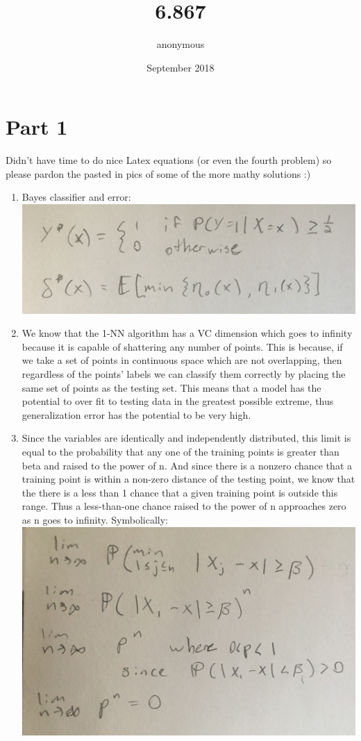 \documentclass{article}
\title{6.867}
\author{anonymous}
\date{September 2018}
\begin{document}
\maketitle

\section{Part 1}
Didn't have time to do nice Latex equations (or even the fourth problem) so please pardon the pasted in pics of some of the more mathy solutions :) 
\begin{enumerate}[label=\alph*.)]
	\item  Bayes classifier and error:\\
	\includegraphics[scale=.05]{IMG_3677.JPG}
	\item We know that the 1-NN algorithm has a VC dimension which goes to infinity because it is capable of shattering any number of points. This is because, if we take a set of points in continuous space which are not overlapping, then regardless of the points' labels we can classify them correctly by placing the same set of points as the testing set. This means that a model has the potential to over fit to testing data in the greatest possible extreme, thus generalization error has the potential to be very high.  
	\item Since the variables are identically and independently distributed, this limit is equal to the probability that any one of the training points is greater than beta and raised to the power of n. And since there is a nonzero chance that a training point is within a non-zero distance of the testing point, we know that the there is a less than 1 chance that a given training point is outside this range. Thus a less-than-one chance raised to the power of n approaches zero as n goes to infinity. Symbolically: \\
	\includegraphics[scale=.05]{IMG_3678.JPG}

\end{enumerate}
\end{document}
